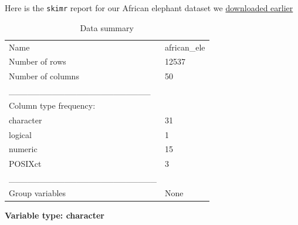 \documentclass[
  letterpaper,
  DIV=11,
  numbers=noendperiod,
  oneside]{scrreprt}
\begin{document}
Here is the \texttt{skimr} report for our African elephant dataset we
\protect\hyperlink{sec-download-data}{downloaded earlier}

\begin{longtable}[]{@{}ll@{}}
\caption{Data summary}\tabularnewline
\toprule()
\endhead
Name & african\_ele \\
Number of rows & 12537 \\
Number of columns & 50 \\
\_\_\_\_\_\_\_\_\_\_\_\_\_\_\_\_\_\_\_\_\_\_\_ & \\
Column type frequency: & \\
character & 31 \\
logical & 1 \\
numeric & 15 \\
POSIXct & 3 \\
\_\_\_\_\_\_\_\_\_\_\_\_\_\_\_\_\_\_\_\_\_\_\_\_ & \\
Group variables & None \\
\bottomrule()
\end{longtable}

\textbf{Variable type: character}
\end{document}
